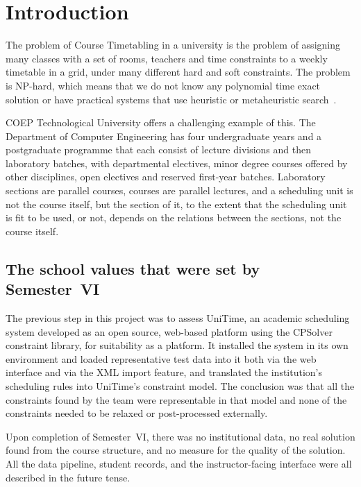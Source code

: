 \section{Introduction}
\label{sec:intro}

The problem of Course Timetabling in a university is the problem of assigning many classes with a set of rooms, teachers and time constraints to a weekly timetable in a grid, under many different hard and soft constraints. The problem is NP-hard, which means that we do not know any polynomial time exact solution or have practical systems that use heuristic or metaheuristic search~\cite{schaerf1999survey,muller2007}.

COEP Technological University offers a challenging example of this. The Department of Computer Engineering has four undergraduate years and a postgraduate programme that each consist of lecture divisions and then laboratory batches, with departmental electives, minor degree courses offered by other disciplines, open electives and reserved first-year batches. Laboratory sections are parallel courses, courses are parallel lectures, and a scheduling unit is not the course itself, but the section of it, to the extent that the scheduling unit is fit to be used, or not, depends on the relations between the sections, not the course itself.

\subsection{The school values that were set by Semester~VI}

The previous step in this project was to assess UniTime, an academic scheduling system developed as an open source, web-based platform using the CPSolver constraint library, for suitability as a platform. It installed the system in its own environment and loaded representative test data into it both via the web interface and via the XML import feature, and translated the institution's scheduling rules into UniTime's constraint model. The conclusion was that all the constraints found by the team were representable in that model and none of the constraints needed to be relaxed or post-processed externally.

Upon completion of Semester~VI, there was no institutional data, no real solution found from the course structure, and no measure for the quality of the solution. All the data pipeline, student records, and the instructor-facing interface were all described in the future tense.


